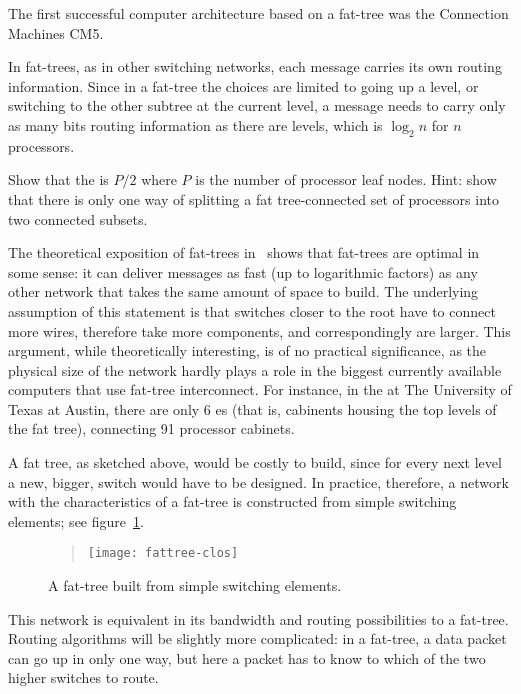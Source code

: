 The first successful computer
architecture based on a fat-tree was the Connection Machines CM5.

In fat-trees, as in other switching networks, each message carries its
own routing information. Since in a fat-tree the choices are limited
to going up a level, or switching to the other subtree at the
current level, a message needs to carry only as many bits routing
information as there are levels, which is $\log_2n$ for $n$
processors.

\begin{exercise}
Show that the  is $P/2$
where $P$ is the number of processor leaf nodes. Hint: show that there
is only one way of splitting a fat tree-connected set of processors
into two connected subsets.
\end{exercise}

The theoretical exposition of fat-trees in~\cite{Leiserson:fattree}
shows that fat-trees are optimal in some sense: it can deliver
messages as fast (up to logarithmic factors) as any other network that
takes the same amount of space to build. The underlying assumption of
this statement is that switches closer to the root have to connect
more wires, therefore take more components, and correspondingly are
larger. 
%
This argument, while theoretically interesting, is of no practical
significance, as the physical size of the network hardly plays a role
in the biggest currently available computers that use fat-tree
interconnect. For instance, in the
 at The
University of Texas at Austin,
there are only 6 es
(that is, cabinents housing the top levels of the fat tree),
connecting 91 processor cabinets.

A fat tree, as sketched above, would be costly to build, since for
every next level a new, bigger, switch would have to be designed. In
practice, therefore, a network with the characteristics of a fat-tree
is constructed from simple switching elements; see
figure~\ref{fig:fattreeclos}.
\begin{figure}[ht]
  \begin{quote}
    \texttt{[image: fattree-clos]}
  \end{quote}
  \caption{A fat-tree built from simple switching elements.}
  \label{fig:fattreeclos}
\end{figure}
This network is equivalent in its bandwidth and routing possibilities
to a fat-tree. Routing algorithms will be slightly more complicated:
in a fat-tree, a data packet can go up in only one way, but here a
packet has to know to which of the two higher switches to route.

